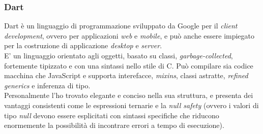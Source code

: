 \subsubsection{Dart}
Dart è un linguaggio di programmazione sviluppato da Google per il \textit{client development}, ovvero per applicazioni \textit{web} e \textit{mobile}, e può anche essere impiegato per la costruzione di applicazione \textit{desktop} e \textit{server}.\\
E' un linguaggio orientato agli oggetti, basato su classi, \textit{garbage-collected}, fortemente tipizzato e con una sintassi nello stile di C. Può compilare sia codice macchina che JavaScript e supporta interefacce, \textit{mixins}, classi astratte, \textit{refined generics} e inferenza di tipo.\\
Personalmente l'ho trovato elegante e conciso nella sua struttura, e presenta dei vantaggi consistenti come le espressioni ternarie e la \textit{null safety} (ovvero i valori di tipo \textit{null} devono essere esplicitati con sintassi specifiche che riducono enormemente la possibilità di incontrare errori a tempo di esecuzione).

